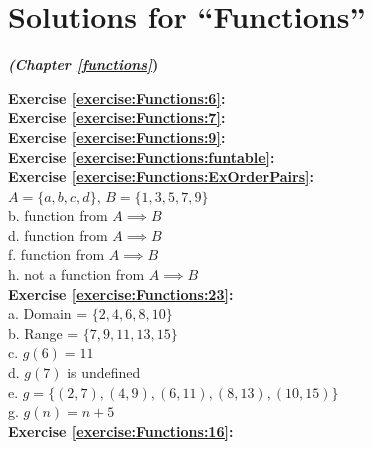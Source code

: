 \section{Solutions for ``Functions''}
\noindent\textbf{\textit{ (Chapter \ref{functions}})}\bigskip


\noindent\textbf{Exercise \ref{exercise:Functions:6}:}\\

\noindent\textbf{Exercise \ref{exercise:Functions:7}:}\\

\noindent\textbf{Exercise \ref{exercise:Functions:9}:}\\

\noindent\textbf{Exercise \ref{exercise:Functions:funtable}:}\\

\noindent\textbf{Exercise \ref{exercise:Functions:ExOrderPairs}:}\\
$A=\{a,b,c,d\}$, $B=\{1,3,5,7,9\}$\\
b. function from $A \implies B$\\
d. function from $A \implies B$\\
f. function from $A \implies B$\\
h. not a function from $A \implies B$\\


\noindent\textbf{Exercise \ref{exercise:Functions:23}:}\\
a. Domain = $\{2,4,6,8,10\}$\\
b. Range = $\{7,9,11,13,15\}$\\
c. $g(6)=11$\\
d. $g(7)$ is undefined\\
e. $g=\{(2,7),(4,9),(6,11),(8,13),(10,15)\}$\\
g. $g(n)=n+5$\\


\noindent\textbf{Exercise \ref{exercise:Functions:16}:}\\


